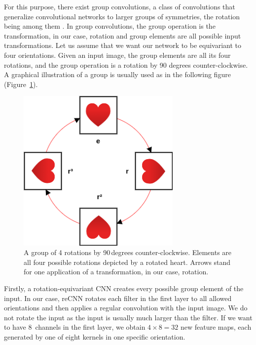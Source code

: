 For this purpose, there exist group convolutions, a class of convolutions that generalize convolutional networks to larger groups of symmetries, the rotation being among them \citep{cohen2016group}. In group convolutions, the group operation is the transformation, in our case, rotation and group elements are all possible input transformations. Let us assume that we want our network to be equivariant to four orientations. Given an input image, the group elements are all its four rotations, and the group operation is a rotation by 90 degrees counter-clockwise. A graphical illustration of a group is usually used as in the following figure (Figure~\ref{img03:group}).

\begin{figure}[h]\centering
	\includegraphics[width=80mm]{../img/group.png}
	\caption{A group of 4 rotations by 90\,degrees counter-clockwise. Elements are all four possible rotations depicted by a rotated heart. Arrows stand for one application of a transformation, in our case, rotation.}
	\label{img03:group}
\end{figure}

Firstly, a rotation-equivariant CNN creates every possible group element of the input. In our case, reCNN rotates each filter in the first layer to all allowed orientations and then applies a regular convolution with the input image. We do not rotate the input as the input is usually much larger than the filter. If we want to have 8~channels in the first layer, we obtain $4\times8 = 32$ new feature maps, each generated by one of eight kernels in one specific orientation.

